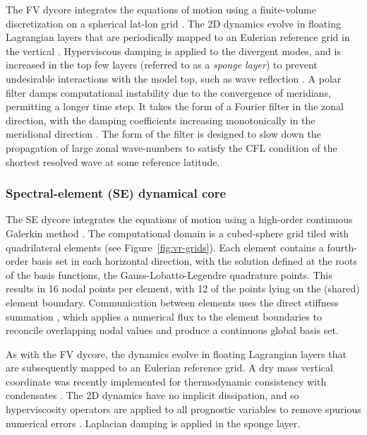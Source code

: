 \documentclass[draft]{agujournal2019}
\begin{document}
The FV dycore integrates the {\color{blue}{hydrostatic}} equations of motion using a finite-volume discretization on a spherical lat-lon grid \cite{LR1997QJR}. The 2D dynamics evolve in floating Lagrangian layers that are periodically mapped to an Eulerian reference grid in the vertical \cite{L2004MWR}. Hyperviscous damping is applied to the divergent modes, and is increased in the top few layers (referred to as a \textit{sponge layer}) to prevent undesirable interactions with the model top, such as wave reflection \cite{L2011IJHPC}. A polar filter damps computational instability due to the convergence of meridians, permitting a longer time step. It takes the form of a Fourier filter in the zonal direction, with the damping coefficients increasing monotonically in the meridional direction \cite{ST1995GEOS}. The form of the filter is designed to slow down the propagation of large zonal wave-numbers to satisfy the CFL condition of the shortest resolved wave at some reference latitude.

\subsubsection{Spectral-element (SE) dynamical core}

The SE dycore integrates the {\color{blue}{hydrostatic}} equations of motion using a high-order continuous Galerkin method \cite{TTI1997JCP,TF2010JCP}. The computational domain is a cubed-sphere grid tiled with quadrilateral elements (see Figure~\ref{fig:vr-grids}). Each element contains a fourth-order basis set in each horizontal direction, with the solution defined at the roots of the basis functions, the Gauss-Lobatto-Legendre quadrature points. This results in 16 nodal points per element, with 12 of the points lying on the (shared) element boundary. Communication between elements uses the direct stiffness summation \cite{canuto2007}, which applies a numerical flux to the element boundaries to reconcile overlapping nodal values and produce a continuous global basis set. 

As with the FV dycore, the dynamics evolve in floating Lagrangian layers that are subsequently mapped to an Eulerian reference grid. A dry mass vertical coordinate was recently implemented for thermodynamic consistency with condensates \cite{LetAl2018JAMES}. The 2D dynamics have no implicit dissipation, and so hyperviscosity operators are applied to all prognostic variables to remove spurious numerical errors \cite{DetAl2012IJHPCA}. Laplacian damping is applied in the sponge layer.
\end{document}
